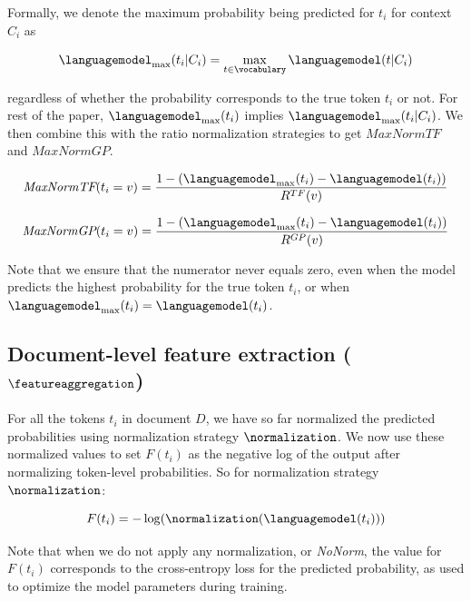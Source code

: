 \documentclass[twocolumn,10pt]{article}
\begin{document}
Formally, we denote the maximum probability being predicted for $t_i$ for context $C_i$ as 

\begin{equation}
    \languagemodel_{\text{max}}(t_i|C_i) = \max_{t \in \vocabulary}\languagemodel(t|C_i)
\end{equation}

regardless of whether the probability corresponds to the true token $t_i$ or not. For rest of the paper, $\languagemodel_{\text{max}}(t_i)$ implies $\languagemodel_{\text{max}}(t_i|C_i)$. We then combine this with the ratio normalization strategies to get $\textit{MaxNormTF}$ and $\textit{MaxNormGP}$.

\begin{equation}
    \textit{MaxNormTF}(t_i=v) = \frac{ 1 - (\languagemodel_{\text{max}}(t_i) - \languagemodel(t_i))}{R^{TF}(v)}
\end{equation}

\begin{equation}
    \textit{MaxNormGP}(t_i=v) = \frac{ 1 - (\languagemodel_{\text{max}}(t_i) - \languagemodel(t_i))}{R^{GP}(v)}
\end{equation}

Note that we ensure that the numerator never equals zero, even when the model predicts the highest probability for the true token $t_i$, or when $\languagemodel_{\text{max}}(t_i) =\languagemodel(t_i)$.

\subsection{Document-level feature extraction (\texorpdfstring{$\featureaggregation$}{Lg})}

For all the tokens $t_i$ in document $D$, we have so far normalized the predicted probabilities using normalization strategy $\normalization$. We now use these normalized values to set $F(t_i)$ as the negative log of the output after normalizing token-level probabilities. So for normalization strategy $\normalization$:

\begin{equation}
    F(t_i)=-\log(\normalization(\languagemodel(t_i)))
\end{equation}

Note that when we do not apply any normalization, or \textit{NoNorm}, the value for $F(t_i)$ corresponds to the cross-entropy loss for the predicted probability, as used to optimize the model parameters during training. 
\end{document}
